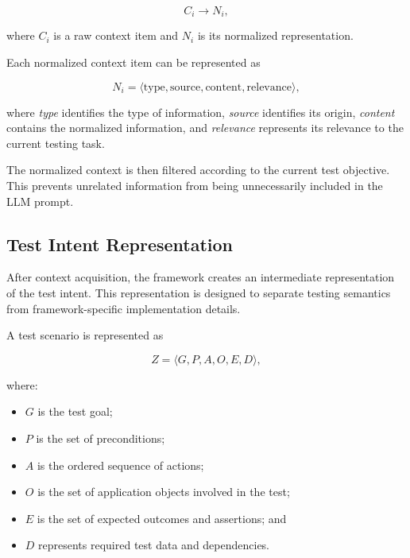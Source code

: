 \documentclass[pdflatex,sn-mathphys-num]{sn-jnl}
\begin{document}
\begin{equation}
    C_i
    \rightarrow
    N_i,
\label{eq:context-normalization}
\end{equation}

where $C_i$ is a raw context item and $N_i$ is its normalized
representation.

Each normalized context item can be represented as

\begin{equation}
    N_i =
    \langle
    \text{type},
    \text{source},
    \text{content},
    \text{relevance}
    \rangle ,
\label{eq:normalized-context}
\end{equation}

where \textit{type} identifies the type of information, \textit{source}
identifies its origin, \textit{content} contains the normalized information,
and \textit{relevance} represents its relevance to the current testing
task.

The normalized context is then filtered according to the current test
objective. This prevents unrelated information from being unnecessarily
included in the LLM prompt.

\subsection{Test Intent Representation}
\label{subsec:test-intent}

After context acquisition, the framework creates an intermediate
representation of the test intent. This representation is designed to
separate testing semantics from framework-specific implementation details.

A test scenario is represented as

\begin{equation}
    Z =
    \langle
    G,P,A,O,E,D
    \rangle ,
\label{eq:method-test-intent}
\end{equation}

where:

\begin{itemize}
    \item $G$ is the test goal;
    \item $P$ is the set of preconditions;
    \item $A$ is the ordered sequence of actions;
    \item $O$ is the set of application objects involved in the test;
    \item $E$ is the set of expected outcomes and assertions; and
    \item $D$ represents required test data and dependencies.
\end{itemize}
\end{document}
